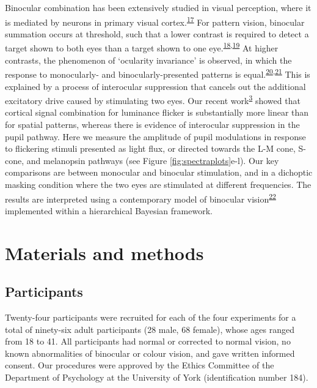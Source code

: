 \documentclass[
]{article}
\begin{document}
Binocular combination has been extensively studied in visual perception, where it is mediated by neurons in primary visual cortex.\textsuperscript{\protect\hyperlink{ref-Hubel1962}{17}} For pattern vision, binocular summation occurs at threshold, such that a lower contrast is required to detect a target shown to both eyes than a target shown to one eye.\textsuperscript{\protect\hyperlink{ref-Baker2018}{18},\protect\hyperlink{ref-Campbell1965}{19}} At higher contrasts, the phenomenon of `ocularity invariance' is observed, in which the response to monocularly- and binocularly-presented patterns is equal.\textsuperscript{\protect\hyperlink{ref-Baker2007}{20},\protect\hyperlink{ref-Moradi2009}{21}} This is explained by a process of interocular suppression that cancels out the additional excitatory drive caused by stimulating two eyes. Our recent work\textsuperscript{\protect\hyperlink{ref-Segala2023}{3}} showed that cortical signal combination for luminance flicker is substantially more linear than for spatial patterns, whereas there is evidence of interocular suppression in the pupil pathway. Here we measure the amplitude of pupil modulations in response to flickering stimuli presented as light flux, or directed towards the L-M cone, S-cone, and melanopsin pathways (see Figure \ref{fig:spectraplots}e-l). Our key comparisons are between monocular and binocular stimulation, and in a dichoptic masking condition where the two eyes are stimulated at different frequencies. The results are interpreted using a contemporary model of binocular vision\textsuperscript{\protect\hyperlink{ref-Meese2006}{22}} implemented within a hierarchical Bayesian framework.

\hypertarget{materials-and-methods}{%
\section{Materials and methods}\label{materials-and-methods}}

\hypertarget{participants}{%
\subsection{Participants}\label{participants}}

Twenty-four participants were recruited for each of the four experiments for a total of ninety-six adult participants (28 male, 68 female), whose ages ranged from 18 to 41. All participants had normal or corrected to normal vision, no known abnormalities of binocular or colour vision, and gave written informed consent. Our procedures were approved by the Ethics Committee of the Department of Psychology at the University of York (identification number 184).
\end{document}

